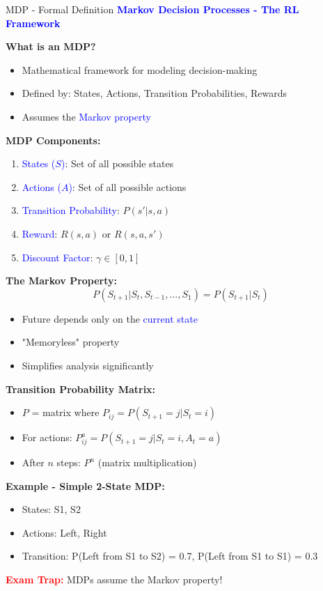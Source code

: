 \documentclass[8pt]{beamer}
\begin{document}

\begin{frame}{MDP - Formal Definition}
\fontsize{6.5}{7.5}\selectfont
\textcolor{blue}{\textbf{Markov Decision Processes - The RL Framework}}

\textbf{What is an MDP?}
\begin{itemize}
\item Mathematical framework for modeling decision-making
\item Defined by: States, Actions, Transition Probabilities, Rewards
\item Assumes the \textcolor{blue}{Markov property}
\end{itemize}

\textbf{MDP Components:}
\begin{enumerate}
\item \textcolor{blue}{States ($S$)}: Set of all possible states
\item \textcolor{blue}{Actions ($A$)}: Set of all possible actions
\item \textcolor{blue}{Transition Probability}: $P(s'|s,a)$
\item \textcolor{blue}{Reward}: $R(s,a)$ or $R(s,a,s')$
\item \textcolor{blue}{Discount Factor}: $\gamma \in [0,1]$
\end{enumerate}

\textbf{The Markov Property:}
\[
P(S_{t+1} | S_t, S_{t-1}, ..., S_1) = P(S_{t+1} | S_t)
\]
\begin{itemize}
\item Future depends only on the \textcolor{blue}{current state}
\item "Memoryless" property
\item Simplifies analysis significantly
\end{itemize}

\textbf{Transition Probability Matrix:}
\begin{itemize}
\item $P$ = matrix where $P_{ij} = P(S_{t+1} = j | S_t = i)$
\item For actions: $P^a_{ij} = P(S_{t+1} = j | S_t = i, A_t = a)$
\item After $n$ steps: $P^n$ (matrix multiplication)
\end{itemize}

\textbf{Example - Simple 2-State MDP:}
\begin{itemize}
\item States: S1, S2
\item Actions: Left, Right
\item Transition: P(Left from S1 to S2) = 0.7, P(Left from S1 to S1) = 0.3
\end{itemize}

\textcolor{red}{\textbf{Exam Trap:}} MDPs assume the Markov property!
\end{frame}
\end{document}
